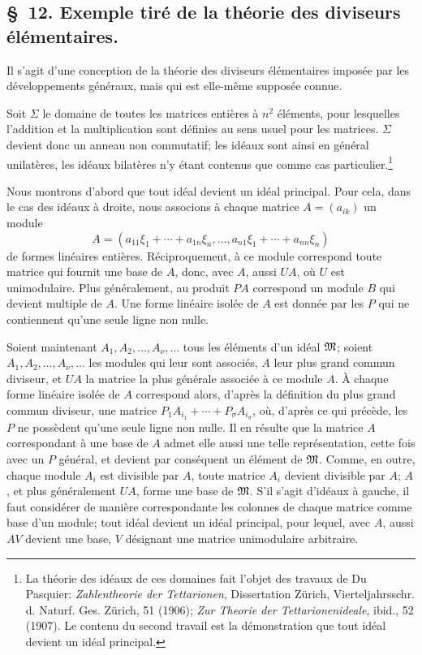 
\setcounter{footnote}{47}
\subsection*{\S~12. Exemple tiré de la théorie des diviseurs élémentaires.}

Il s'agit d'une conception de la théorie des diviseurs élémentaires imposée par les développements généraux, mais qui est elle-même supposée connue.

Soit $\Sigma$ le domaine de toutes les matrices entières à $n^2$ éléments, pour lesquelles l'addition et la multiplication sont définies au sens usuel pour les matrices. $\Sigma$ devient donc un anneau non commutatif; les idéaux sont ainsi en général unilatères, les idéaux bilatères n'y étant contenus que comme cas particulier.\footnote{La théorie des idéaux de ces domaines fait l'objet des travaux de Du Pasquier: \emph{Zahlentheorie der Tettarionen}, Dissertation Zürich, Vierteljahrsschr. d. Naturf. Ges. Zürich, 51 (1906); \emph{Zur Theorie der Tettarionenideale}, ibid., 52 (1907). Le contenu du second travail est la démonstration que tout idéal devient un idéal principal.}

Nous montrons d'abord que tout idéal devient un idéal principal. Pour cela, dans le cas des idéaux à droite, nous associons à chaque matrice $A=(a_{ik})$ un module
\[
 A=(a_{11}\xi_1+\cdots+a_{1n}\xi_n,
 \ldots,
 a_{n1}\xi_1+\cdots+a_{nn}\xi_n)
\]
de formes linéaires entières. Réciproquement, à ce module correspond toute matrice qui fournit une base de $A$, donc, avec $A$, aussi $UA$, où $U$ est unimodulaire. Plus généralement, au produit $PA$ correspond un module $B$ qui devient multiple de $A$. Une forme linéaire isolée de $A$ est donnée par les $P$ qui ne contiennent qu'une seule ligne non nulle.

Soient maintenant $A_1,A_2,
\ldots,A_\nu,
\ldots$ tous les éléments d'un idéal $\mathfrak{M}$; soient $A_1,A_2,
\ldots,A_\nu,
\ldots$ les modules qui leur sont associés, $A$ leur plus grand commun diviseur, et $UA$ la matrice la plus générale associée à ce module $A$. À chaque forme linéaire isolée de $A$ correspond alors, d'après la définition du plus grand commun diviseur, une matrice $P_1A_{i_1}+\cdots+P_\sigma A_{i_\sigma}$, où, d'après ce qui précède, les $P$ ne possèdent qu'une seule ligne non nulle. Il en résulte que la matrice $A$ correspondant à une base de $A$ admet elle aussi une telle représentation, cette fois avec un $P$ général, et devient par conséquent un élément de $\mathfrak{M}$. Comme, en outre, chaque module $A_i$ est divisible par $A$, toute matrice $A_i$ devient divisible par $A$; $A$, et plus généralement $UA$, forme une base de $\mathfrak{M}$. S'il s'agit d'idéaux à gauche, il faut considérer de manière correspondante les colonnes de chaque matrice comme base d'un module; tout idéal devient un idéal principal, pour lequel, avec $A$, aussi $AV$ devient une base, $V$ désignant une matrice unimodulaire arbitraire.

